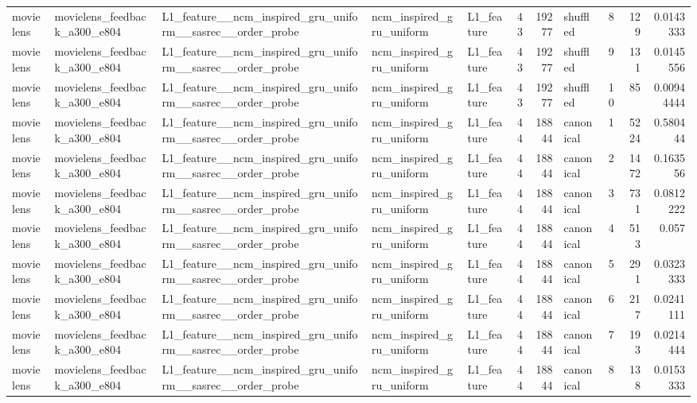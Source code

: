 \begin{table}[htbp!]
\begin{tabular}{lllllrrlrrr}
movielens & movielens\_feedback\_a300\_e804 & L1\_feature\_\_ncm\_inspired\_gru\_uniform\_\_sasrec\_\_order\_probe & ncm\_inspired\_gru\_uniform & L1\_feature & 43 & 19277 & shuffled & 8 & 129 & 0.0143333 \\
movielens & movielens\_feedback\_a300\_e804 & L1\_feature\_\_ncm\_inspired\_gru\_uniform\_\_sasrec\_\_order\_probe & ncm\_inspired\_gru\_uniform & L1\_feature & 43 & 19277 & shuffled & 9 & 131 & 0.0145556 \\
movielens & movielens\_feedback\_a300\_e804 & L1\_feature\_\_ncm\_inspired\_gru\_uniform\_\_sasrec\_\_order\_probe & ncm\_inspired\_gru\_uniform & L1\_feature & 43 & 19277 & shuffled & 10 & 85 & 0.00944444 \\
movielens & movielens\_feedback\_a300\_e804 & L1\_feature\_\_ncm\_inspired\_gru\_uniform\_\_sasrec\_\_order\_probe & ncm\_inspired\_gru\_uniform & L1\_feature & 44 & 18844 & canonical & 1 & 5224 & 0.580444 \\
movielens & movielens\_feedback\_a300\_e804 & L1\_feature\_\_ncm\_inspired\_gru\_uniform\_\_sasrec\_\_order\_probe & ncm\_inspired\_gru\_uniform & L1\_feature & 44 & 18844 & canonical & 2 & 1472 & 0.163556 \\
movielens & movielens\_feedback\_a300\_e804 & L1\_feature\_\_ncm\_inspired\_gru\_uniform\_\_sasrec\_\_order\_probe & ncm\_inspired\_gru\_uniform & L1\_feature & 44 & 18844 & canonical & 3 & 731 & 0.0812222 \\
movielens & movielens\_feedback\_a300\_e804 & L1\_feature\_\_ncm\_inspired\_gru\_uniform\_\_sasrec\_\_order\_probe & ncm\_inspired\_gru\_uniform & L1\_feature & 44 & 18844 & canonical & 4 & 513 & 0.057 \\
movielens & movielens\_feedback\_a300\_e804 & L1\_feature\_\_ncm\_inspired\_gru\_uniform\_\_sasrec\_\_order\_probe & ncm\_inspired\_gru\_uniform & L1\_feature & 44 & 18844 & canonical & 5 & 291 & 0.0323333 \\
movielens & movielens\_feedback\_a300\_e804 & L1\_feature\_\_ncm\_inspired\_gru\_uniform\_\_sasrec\_\_order\_probe & ncm\_inspired\_gru\_uniform & L1\_feature & 44 & 18844 & canonical & 6 & 217 & 0.0241111 \\
movielens & movielens\_feedback\_a300\_e804 & L1\_feature\_\_ncm\_inspired\_gru\_uniform\_\_sasrec\_\_order\_probe & ncm\_inspired\_gru\_uniform & L1\_feature & 44 & 18844 & canonical & 7 & 193 & 0.0214444 \\
movielens & movielens\_feedback\_a300\_e804 & L1\_feature\_\_ncm\_inspired\_gru\_uniform\_\_sasrec\_\_order\_probe & ncm\_inspired\_gru\_uniform & L1\_feature & 44 & 18844 & canonical & 8 & 138 & 0.0153333 \\

\end{tabular}
\end{table}
